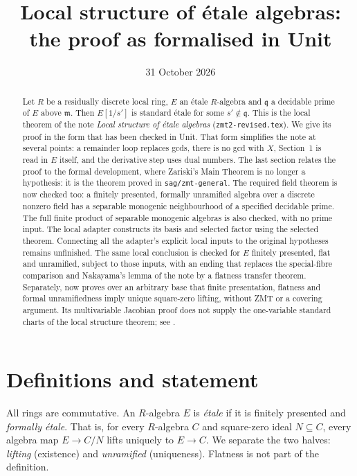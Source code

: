 \documentclass[11pt]{amsart}
\title[Local structure of \'etale algebras]{Local structure of \'etale
algebras:\\ the proof as formalised in Unit}
\date{31 October 2026}
\numberwithin{equation}{section}
\theoremstyle{definition}
\theoremstyle{remark}
\newcommand{\m}{\mathfrak m}
\newcommand{\q}{\mathfrak q}
\newcommand{\code}[1]{\texttt{#1}}
\begin{document}
\sloppy
\begin{abstract}
Let $R$ be a residually discrete local ring, $E$ an \'etale $R$-algebra
and $\q$ a decidable prime of $E$ above $\m$. Then $E[1/s']$ is
standard \'etale for some $s'\notin\q$. This is the local theorem of
the note \emph{Local structure of \'etale algebras}
(\code{zmt2-revised.tex}). We give its proof in the form that has been
checked in Unit. That form simplifies the note at several points: a
remainder loop replaces gcds, there is no gcd with $X$, Section~1 is
read in $E$ itself, and the derivative step uses dual numbers. The last
section relates the proof to the formal development, where Zariski's
Main Theorem is no longer a hypothesis: it is the theorem proved in
\code{sag/zmt-general}. The required field theorem is now checked too:
a finitely presented, formally unramified algebra over a discrete
nonzero field has a separable monogenic neighbourhood of a specified
decidable prime. The full finite product of separable monogenic
algebras is also checked, with no prime input. The local adapter
constructs its basis and selected factor using the selected theorem.
Connecting all the adapter's explicit local
inputs to the original hypotheses remains unfinished. The same local
conclusion is checked for $E$ finitely presented, flat and unramified,
subject to those inputs, with an ending that replaces the special-fibre
comparison and Nakayama's lemma of the note by a flatness transfer theorem.
Separately,  now proves over an arbitrary base
that finite presentation, flatness and formal unramifiedness imply unique
square-zero lifting, without ZMT or a covering argument. Its multivariable
Jacobian proof does not supply the one-variable standard charts of the
local structure theorem; see .
\end{abstract}
\maketitle

\section{Definitions and statement}

All rings are commutative. An $R$-algebra $E$ is \emph{\'etale} if it
is finitely presented and \emph{formally \'etale}. That is, for every
$R$-algebra $C$ and square-zero ideal $N\subseteq C$, every algebra map
$E\to C/N$ lifts uniquely to $E\to C$. We separate the two halves:
\emph{lifting} (existence) and \emph{unramified} (uniqueness). Flatness
is not part of the definition.
\end{document}

